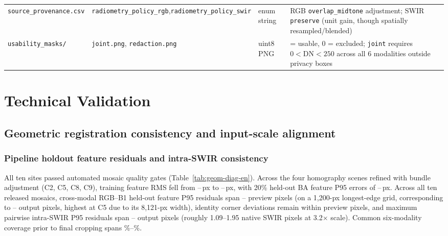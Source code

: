 \documentclass[a4paper,10pt]{article}
\begin{document}
\begin{table}[htbp]
\begin{tabularx}{\textwidth}{@{}>{\raggedright\arraybackslash}p{}>{\raggedright\arraybackslash}p{}>{\raggedright\arraybackslash}p{}>{\raggedright\arraybackslash}X@{}}
\texttt{source\_provenance.csv} & \texttt{radiometry\_policy\_rgb},\newline \texttt{radiometry\_policy\_swir} & enum string & RGB \texttt{overlap\_midtone} adjustment; SWIR \texttt{preserve} (unit gain, though spatially resampled/blended)\\
\texttt{usability\_masks/} & \texttt{joint.png}, \texttt{redaction.png} & uint8 PNG & 255 = usable, 0 = excluded; \texttt{joint} requires $0<\mathrm{DN}<250$ across all 6 modalities outside privacy boxes\\
\bottomrule
\end{tabularx}
\end{table}

\section{Technical Validation}\label{sec:tech-en}
\subsection{Geometric registration consistency and input-scale alignment}\label{sec:geom-val-en}
\subsubsection{Pipeline holdout feature residuals and intra-SWIR consistency}
All ten sites passed automated mosaic quality gates (Table~\ref{tab:geom-diag-en}). Across the four homography scenes refined with bundle adjustment (C2, C5, C8, C9), training feature RMS fell from \GeomBaBeforeMin--\GeomBaBeforeMax\,px to \GeomBaAfterMin--\GeomBaAfterMax\,px, with 20\% held-out BA feature P95 errors of \GeomBaHoldoutMin--\GeomBaHoldoutMax\,px. Across all ten released mosaics, cross-modal RGB--B1 held-out feature P95 residuals span \GeomRgbBOnePrevMin--\GeomRgbBOnePrevMax{} preview pixels (on a 1,200-px longest-edge grid, corresponding to \GeomRgbBOneOutMin--\GeomRgbBOneOutMax{} output pixels, highest at C5 due to its 8,121-px width), identity corner deviations remain within \GeomCornerPrevMax{} preview pixels, and maximum pairwise intra-SWIR P95 residuals span \GeomIntraSwirMin--\GeomIntraSwirMax{} output pixels (roughly 1.09--1.95 native SWIR pixels at 3.2$\times$ scale). Common six-modality coverage prior to final cropping spans \GeomCovMin\%--\GeomCovMax\%.
\end{document}
